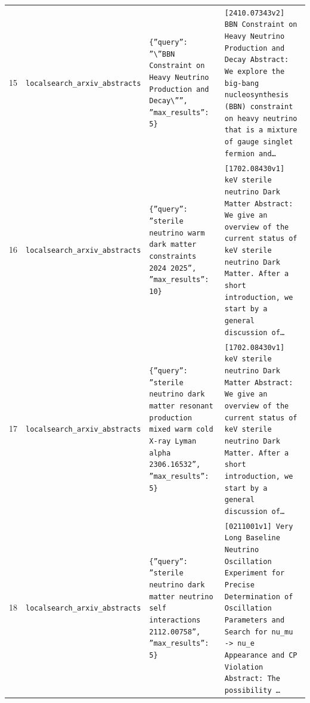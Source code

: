 \documentclass[11pt,a4paper]{article}
\begin{document}
\begin{longtable}{@{}p{}p{}p{}p{}@{}}
15 & \texttt{local}\newline\texttt{search\_\allowbreak{}arxiv\_\allowbreak{}abstracts} & \texttt{\{''query'':\allowbreak{} ''\textbackslash{}\allowbreak{}''BBN Constraint on Heavy Neutrino Production and Decay\textbackslash{}\allowbreak{}'''',\allowbreak{} ''max\_\allowbreak{}results'':\allowbreak{} 5\}\allowbreak{}} & \texttt{[2410.07343v2]\allowbreak{} BBN Constraint on Heavy Neutrino Production and Decay Abstract:\allowbreak{} We explore the big-bang nucleosynthesis (BBN)\allowbreak{} constraint on heavy neutrino that is a mixture of gauge singlet fermion and\ldots{}\allowbreak{}} \\
16 & \texttt{local}\newline\texttt{search\_\allowbreak{}arxiv\_\allowbreak{}abstracts} & \texttt{\{''query'':\allowbreak{} ''sterile neutrino warm dark matter constraints 2024 2025'',\allowbreak{} ''max\_\allowbreak{}results'':\allowbreak{} 10\}\allowbreak{}} & \texttt{[1702.08430v1]\allowbreak{} keV sterile neutrino Dark Matter Abstract:\allowbreak{} We give an overview of the current status of keV sterile neutrino Dark Matter. After a short introduction,\allowbreak{} we start by a general discussion of\ldots{}\allowbreak{}} \\
17 & \texttt{local}\newline\texttt{search\_\allowbreak{}arxiv\_\allowbreak{}abstracts} & \texttt{\{''query'':\allowbreak{} ''sterile neutrino dark matter resonant production mixed warm cold X-ray Lyman alpha 2306.16532'',\allowbreak{} ''max\_\allowbreak{}results'':\allowbreak{} 5\}\allowbreak{}} & \texttt{[1702.08430v1]\allowbreak{} keV sterile neutrino Dark Matter Abstract:\allowbreak{} We give an overview of the current status of keV sterile neutrino Dark Matter. After a short introduction,\allowbreak{} we start by a general discussion of\ldots{}\allowbreak{}} \\
18 & \texttt{local}\newline\texttt{search\_\allowbreak{}arxiv\_\allowbreak{}abstracts} & \texttt{\{''query'':\allowbreak{} ''sterile neutrino dark matter neutrino self interactions 2112.00758'',\allowbreak{} ''max\_\allowbreak{}results'':\allowbreak{} 5\}\allowbreak{}} & \texttt{[0211001v1]\allowbreak{} Very Long Baseline Neutrino Oscillation Experiment for Precise Determination of Oscillation Parameters and Search for nu\_\allowbreak{}mu -\textgreater{}\allowbreak{} nu\_\allowbreak{}e Appearance and CP Violation Abstract:\allowbreak{}   The possibility \ldots{}\allowbreak{}} \\

\end{longtable}
\end{document}
